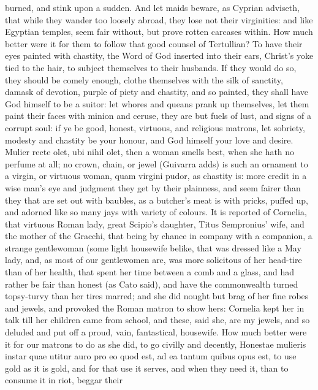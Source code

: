 {burned, and stink upon a sudden. And let maids beware, as Cyprian
adviseth, that while they wander too loosely abroad, they lose not
their virginities: and like Egyptian temples, seem fair without, but
prove rotten carcases within. How much better were it for them to
follow that good counsel of Tertullian? To have their eyes
painted with chastity, the Word of God inserted into their ears,
Christ's yoke tied to the hair, to subject themselves to their
husbands. If they would do so, they should be comely enough, clothe
themselves with the silk of sanctity, damask of devotion, purple of
piety and chastity, and so painted, they shall have God himself to be a
suitor: let whores and queans prank up themselves, let them paint
their faces with minion and ceruse, they are but fuels of lust, and
signs of a corrupt soul: if ye be good, honest, virtuous, and religious
matrons, let sobriety, modesty and chastity be your honour, and God
himself your love and desire. Mulier recte olet, ubi nihil olet, then a
woman smells best, when she hath no perfume at all; no crown, chain, or
jewel (Guivarra adds) is such an ornament to a virgin, or virtuous
woman, quam virgini pudor, as chastity is: more credit in a wise man's
eye and judgment they get by their plainness, and seem fairer than they
that are set out with baubles, as a butcher's meat is with pricks,
puffed up, and adorned like so many jays with variety of colours. It is
reported of Cornelia, that virtuous Roman lady, great Scipio's
daughter, Titus Sempronius' wife, and the mother of the Gracchi, that
being by chance in company with a companion, a strange gentlewoman
(some light housewife belike, that was dressed like a May lady, and, as
most of our gentlewomen are, was more solicitous of her head-tire
than of her health, that spent her time between a comb and a glass, and
had rather be fair than honest (as Cato said), and have the
commonwealth turned topsy-turvy than her tires marred; and she did
nought but brag of her fine robes and jewels, and provoked the Roman
matron to show hers: Cornelia kept her in talk till her children came
from school, and these, said she, are my jewels, and so deluded and put
off a proud, vain, fantastical, housewife. How much better were it for
our matrons to do as she did, to go civilly and decently,
Honestae mulieris instar quae utitur auro pro eo quod est, ad ea
tantum quibus opus est, to use gold as it is gold, and for that use it
serves, and when they need it, than to consume it in riot, beggar their
}
